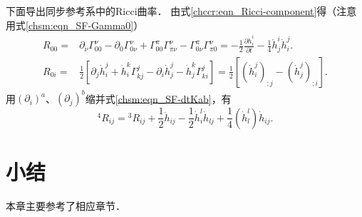 
下面导出同步参考系中的Ricci曲率．
由式\eqref{chccr:eqn_Ricci-component}得（注意用式\eqref{chsm:eqn_SF-Gamma0}）
\begin{align}
	R_{00} =& \partial_\nu \Gamma_{00}^{\nu} -\partial_0 \Gamma_{0\nu}^{\nu}
	+ \Gamma_{00}^{\pi} \Gamma_{\pi\nu}^{\nu} - \Gamma_{0\nu}^{\pi} \Gamma_{\pi 0}^{\nu} 
	=  -\frac{1}{2} \frac{\partial \dot{h}_i^i }{\partial t}   
	-\frac{1}{4} \dot{h}_j^i \dot{h}^j_i.  \label{chsm:eqn_SF-R00} \\
	R_{0i} 
	=&\frac{1}{2}\left[\partial_j \dot{h}^j_i + \dot{h}^k_i \Gamma_{kj}^{j} 
	-\partial_i \dot{h}^j_j - \dot{h}^k_j \Gamma_{ki}^{j} \right]
	=\frac{1}{2}\left[\left(\dot{h}^j_i\right)_{;j} - \left(\dot{h}^j_j\right)_{;i}\right].
	\label{chsm:eqn_SF-R0i}
\end{align}
用$(\partial_i)^a$、$(\partial_j)^b$缩并式\eqref{chsm:eqn_SF-dtKab}，有
\begin{equation}\label{chsm:eqn_SF-Rij}
	{}^4 R_{ij}=  {}^3 R_{ij} +\frac{1}{2}\ddot{h}_{ij} 
	- \frac{1}{2} \dot{h}_{i}^{l} \dot{h}_{lj} 
	+ \frac{1}{4} \left(\dot{h}_{l}^l \right) \dot{h}_{ij}  .
\end{equation}






























\section*{小结}
本章主要参考了\parencite{chen-li-2023-2ed-v1,oneill1983}相应章节．




\printbibliography[heading=subbibliography,title=第\ref{chsm}章参考文献]

\endinput
